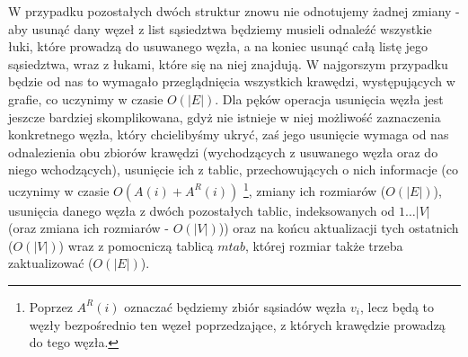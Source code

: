 W przypadku pozostałych dwóch struktur znowu nie odnotujemy żadnej zmiany - aby usunąć dany węzeł z list sąsiedztwa będziemy musieli odnaleźć wszystkie łuki, które prowadzą do usuwanego węzła, a na koniec usunąć całą listę jego sąsiedztwa, wraz z łukami, które się na niej znajdują. W najgorszym przypadku będzie od nas to wymagało przeglądnięcia wszystkich krawędzi, występujących w grafie, co uczynimy w czasie $ O \left( \left| E \right| \right) $. Dla pęków operacja usunięcia węzła jest jeszcze bardziej skomplikowana, gdyż nie istnieje w niej możliwość zaznaczenia konkretnego węzła, który chcielibyśmy ukryć, zaś jego usunięcie wymaga od nas odnalezienia obu zbiorów krawędzi (wychodzących z usuwanego węzła oraz do niego wchodzących), usunięcie ich z tablic, przechowujących o nich informacje (co uczynimy w czasie $ O \left( A \left( i \right) + A^{R} \left( i \right) \right) $ \footnote{Poprzez $A^{R} \left( i \right) $ oznaczać będziemy zbiór sąsiadów węzła $v_{i}$, lecz będą to węzły bezpośrednio ten węzeł poprzedzające, z których krawędzie prowadzą do tego węzła.}, zmiany ich rozmiarów ($ O \left( \left| E \right| \right) $), usunięcia danego węzła z dwóch pozostałych tablic, indeksowanych od $ 1 \ldots \left| V \right| $ (oraz zmiana ich rozmiarów - $ O \left( \left| V \right| \right) $)) oraz na końcu aktualizacji tych ostatnich ($ O \left( \left| V \right| \right) $) wraz z pomocniczą tablicą $mtab$, której rozmiar także trzeba zaktualizować ($ O \left( \left| E \right| \right) $).

